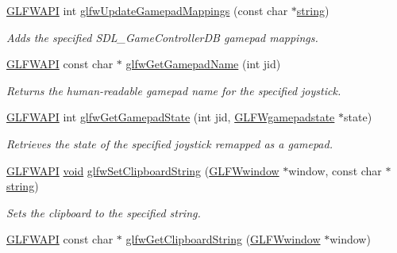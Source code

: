 \begin{DoxyCompactItemize}
\mbox{\hyperlink{glfw3_8h_a56da5036b2cc259351ae22fd6439bb47}{G\+L\+F\+W\+A\+PI}} int \mbox{\hyperlink{group__input_ga276a2aec236a671a99f6f0a9be7fa3fc}{glfw\+Update\+Gamepad\+Mappings}} (const char $\ast$\mbox{\hyperlink{glad_8h_ac83513893df92266f79a515488701770}{string}})
\begin{DoxyCompactList}\small\item\em Adds the specified S\+D\+L\+\_\+\+Game\+Controller\+DB gamepad mappings. \end{DoxyCompactList}\item 
\mbox{\hyperlink{glfw3_8h_a56da5036b2cc259351ae22fd6439bb47}{G\+L\+F\+W\+A\+PI}} const char $\ast$ \mbox{\hyperlink{group__input_ga3eeee2a61f1763b599ab8eb3a4f02d52}{glfw\+Get\+Gamepad\+Name}} (int jid)
\begin{DoxyCompactList}\small\item\em Returns the human-\/readable gamepad name for the specified joystick. \end{DoxyCompactList}\item 
\mbox{\hyperlink{glfw3_8h_a56da5036b2cc259351ae22fd6439bb47}{G\+L\+F\+W\+A\+PI}} int \mbox{\hyperlink{group__input_ga6e138d3b0761546f5a12546f367501d6}{glfw\+Get\+Gamepad\+State}} (int jid, \mbox{\hyperlink{struct_g_l_f_wgamepadstate}{G\+L\+F\+Wgamepadstate}} $\ast$state)
\begin{DoxyCompactList}\small\item\em Retrieves the state of the specified joystick remapped as a gamepad. \end{DoxyCompactList}\item 
\mbox{\hyperlink{glfw3_8h_a56da5036b2cc259351ae22fd6439bb47}{G\+L\+F\+W\+A\+PI}} \mbox{\hyperlink{glad_8h_a950fc91edb4504f62f1c577bf4727c29}{void}} \mbox{\hyperlink{group__input_ga7a580309bbc185a0459c3559021d2fd7}{glfw\+Set\+Clipboard\+String}} (\mbox{\hyperlink{group__window_ga3c96d80d363e67d13a41b5d1821f3242}{G\+L\+F\+Wwindow}} $\ast$window, const char $\ast$\mbox{\hyperlink{glad_8h_ac83513893df92266f79a515488701770}{string}})
\begin{DoxyCompactList}\small\item\em Sets the clipboard to the specified string. \end{DoxyCompactList}\item 
\mbox{\hyperlink{glfw3_8h_a56da5036b2cc259351ae22fd6439bb47}{G\+L\+F\+W\+A\+PI}} const char $\ast$ \mbox{\hyperlink{group__input_ga3ac90c8bbaf0b46063bb02b574f3b6f7}{glfw\+Get\+Clipboard\+String}} (\mbox{\hyperlink{group__window_ga3c96d80d363e67d13a41b5d1821f3242}{G\+L\+F\+Wwindow}} $\ast$window)

\end{DoxyCompactItemize}
